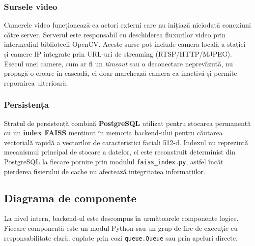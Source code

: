 \documentclass[../../main.tex]{subfiles}
\begin{document}
\subsubsection{Sursele video}

Camerele video funcționează ca actori externi care nu inițiază niciodată \linebreak conexiuni către server. Serverul este responsabil cu deschiderea fluxurilor video prin intermediul bibliotecii OpenCV. Aceste surse pot include camera locală a stației și camere IP integrate prin URL-uri de streaming (RTSP/HTTP/MJPEG). Eșecul unei camere, cum ar fi un \emph{timeout} sau o deconectare neprevăzută, nu propagă o eroare în cascadă, ci doar marchează camera ca inactivă și permite repornirea ulterioară.

\subsubsection{Persistența}

Stratul de persistență combină \textbf{PostgreSQL} utilizat pentru stocarea permanentă cu un \textbf{index FAISS} menținut în memoria backend-ului pentru căutarea vectorială rapidă a vectorilor de caracteristici faciali 512-d. Indexul nu reprezintă mecanismul principal de stocare a datelor, ci este reconstruit determinist din PostgreSQL la fiecare pornire prin modulul \texttt{faiss\_index.py}, astfel încât pierderea fișierului de cache nu afectează integritatea informațiilor.

\subsection{Diagrama de componente}
\label{subsec:diagrama_componente}

La nivel intern, backend-ul este descompus în următoarele componente logice. Fiecare componentă este un modul Python sau un grup de fire de execuție cu responsabilitate clară, cuplate prin cozi \texttt{queue.Queue} sau prin apeluri directe.
\end{document}
